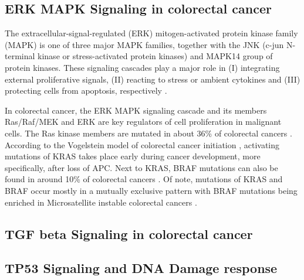 \begin{flushleft}
\subsection{ERK MAPK Signaling in colorectal cancer}
The extracellular-signal-regulated (ERK) mitogen-activated protein kinase family (MAPK) is one of three major MAPK families, together with the JNK (c-jun N-terminal kinase or stress-activated protein kinases) and MAPK14 group of protein kinases. These signaling cascades play a major role in (I) integrating external proliferative signals, (II) reacting to stress or ambient cytokines and (III) protecting cells from apoptosis, respectively \cite{Oncol2005}. 

In colorectal cancer, the ERK MAPK signaling cascade and its members Ras/Raf/MEK and ERK are key regulators of cell proliferation in malignant cells. The Ras kinase members are mutated in about 36\% of colorectal cancers \cite{Oncol2005}. According to the Vogelstein model of colorectal cancer initiation \cite{Fearon1989}, activating mutations of KRAS takes place early during cancer development, more specifically, after loss of APC.
Next to KRAS, BRAF mutations can also be found in around 10\% of colorectal cancers \cite{Oncol2005}. Of note, mutations of KRAS and BRAF occur mostly in a mutually exclusive pattern with BRAF mutations being enriched in Microsatellite instable colorectal cancers \cite{Oncol2005, Sahin2013}. 

\subsection{TGF beta Signaling in colorectal cancer}

\subsection{TP53 Signaling and DNA Damage response}
 


\end{flushleft}
